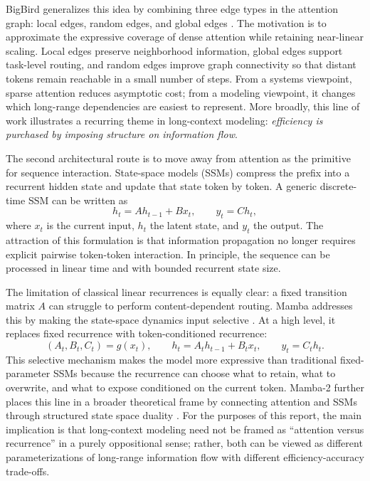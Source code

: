 \documentclass{article}
\begin{document}
BigBird generalizes this idea by combining three edge types in the attention graph: local edges, random edges, and global edges \citep{zaheer2020bigbird}. The motivation is to approximate the expressive coverage of dense attention while retaining near-linear scaling. Local edges preserve neighborhood information, global edges support task-level routing, and random edges improve graph connectivity so that distant tokens remain reachable in a small number of steps. From a systems viewpoint, sparse attention reduces asymptotic cost; from a modeling viewpoint, it changes which long-range dependencies are easiest to represent. More broadly, this line of work illustrates a recurring theme in long-context modeling: \emph{efficiency is purchased by imposing structure on information flow}.

The second architectural route is to move away from attention as the primitive for sequence interaction. State-space models (SSMs) compress the prefix into a recurrent hidden state and update that state token by token. A generic discrete-time SSM can be written as
\begin{equation}
h_t = A h_{t-1} + B x_t,\qquad y_t = C h_t,
\end{equation}
where $x_t$ is the current input, $h_t$ the latent state, and $y_t$ the output. The attraction of this formulation is that information propagation no longer requires explicit pairwise token-token interaction. In principle, the sequence can be processed in linear time and with bounded recurrent state size.

The limitation of classical linear recurrences is equally clear: a fixed transition matrix $A$ can struggle to perform content-dependent routing. Mamba addresses this by making the state-space dynamics input selective \citep{gu2023mamba}. At a high level, it replaces fixed recurrence with token-conditioned recurrence:
\begin{equation}
(A_t,B_t,C_t)=g(x_t),\qquad
h_t=A_t h_{t-1}+B_t x_t,\qquad
y_t=C_t h_t.
\end{equation}
This selective mechanism makes the model more expressive than traditional fixed-parameter SSMs because the recurrence can choose what to retain, what to overwrite, and what to expose conditioned on the current token. Mamba-2 further places this line in a broader theoretical frame by connecting attention and SSMs through structured state space duality \citep{dao2024mamba2}. For the purposes of this report, the main implication is that long-context modeling need not be framed as ``attention versus recurrence'' in a purely oppositional sense; rather, both can be viewed as different parameterizations of long-range information flow with different efficiency-accuracy trade-offs.
\end{document}
